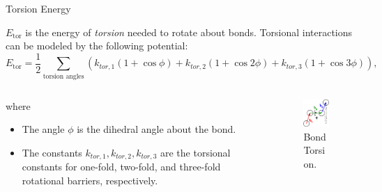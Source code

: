 \documentclass[aspectratio=169]{beamer}
\begin{document}
\begin{frame}[fragile]{Torsion Energy}
	
$E_{\text{tor}}$ is the energy of \emph{torsion} needed to rotate about bonds. Torsional interactions can be modeled by the following potential:
%
\begin{equation}
	E_{\text{tor}} = \frac{1}{2} \sum_{\text{torsion angles}} \left( k_{tor,1}(1 + \cos \phi) + k_{tor,2}(1 + \cos 2\phi) + k_{tor,3}(1 + \cos 3\phi)\right),
\end{equation}
%
%
\begin{columns}
\begin{column}{0.5\textwidth}
	where
	\begin{itemize}
		\item The angle $\phi$ is the dihedral angle about the bond.
		\item The constants $k_{tor,1}, k_{tor,2}, k_{tor,3}$ are the torsional constants for one-fold, two-fold, and three-fold rotational barriers, respectively. 
	\end{itemize}
\end{column}
%
\begin{column}{0.5\textwidth} 
	\begin{figure}
		\includegraphics[scale=0.5]{Graphics/torsion.png}
		\caption{Bond Torsion.}
	\end{figure}
\end{column}
\end{columns}
%

\end{frame}
\end{document}
